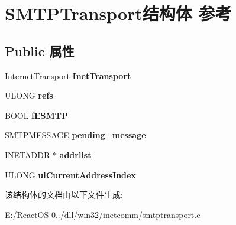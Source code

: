 \hypertarget{struct_s_m_t_p_transport}{}\section{S\+M\+T\+P\+Transport结构体 参考}
\label{struct_s_m_t_p_transport}
\subsection*{Public 属性}
\begin{DoxyCompactItemize}
\item 
\mbox{\label{struct_s_m_t_p_transport_a88d4e5949083e6c4aa2064ff72e0d6b1}} 
\hyperlink{struct_internet_transport}{Internet\+Transport} {\bfseries Inet\+Transport}
\item 
\mbox{\label{struct_s_m_t_p_transport_a9ca5b268c4129195f691f068c77db553}} 
U\+L\+O\+NG {\bfseries refs}
\item 
\mbox{\label{struct_s_m_t_p_transport_ae868dd2943af332c8107af967c347067}} 
B\+O\+OL {\bfseries f\+E\+S\+M\+TP}
\item 
\mbox{\label{struct_s_m_t_p_transport_a7e5909f631cf0cbc3485c8dd351db5ba}} 
S\+M\+T\+P\+M\+E\+S\+S\+A\+GE {\bfseries pending\+\_\+message}
\item 
\mbox{\label{struct_s_m_t_p_transport_ab38f2cec61a3310cde442dfd5fc9bed0}} 
\hyperlink{structtag_i_n_e_t_a_d_d_r}{I\+N\+E\+T\+A\+D\+DR} $\ast$ {\bfseries addrlist}
\item 
\mbox{\label{struct_s_m_t_p_transport_aa3ff95724721375db3cf5867bc014cb0}} 
U\+L\+O\+NG {\bfseries ul\+Current\+Address\+Index}
\end{DoxyCompactItemize}


该结构体的文档由以下文件生成\+:\begin{DoxyCompactItemize}
\item 
E\+:/\+React\+O\+S-\/0../dll/win32/inetcomm/smtptransport.\+c\end{DoxyCompactItemize}
